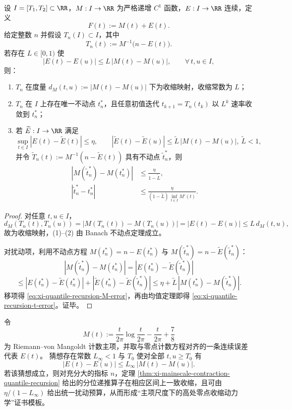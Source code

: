 \begin{theorem}[主项尺度收缩下的分位递推与扰动稳定性]\label{thm:xi-mainscale-contraction-quantile-recursion}
设 \(I=[T_1,T_2]\subset\RR\)，\(M:I\to\RR\) 为严格递增 \(C^1\) 函数，\(E:I\to\RR\) 连续，定义
\[
F(t):=M(t)+E(t).
\]
给定整数 \(n\) 并假设 \(T_n(I)\subset I\)，其中
\[
T_n(t):=M^{-1}\!\bigl(n-E(t)\bigr).
\]
若存在 \(L\in[0,1)\) 使
\[
|E(t)-E(u)|\le L\,|M(t)-M(u)|,\qquad \forall\,t,u\in I,
\]
则：
\begin{enumerate}
\item \(T_n\) 在度量
\(
d_M(t,u):=|M(t)-M(u)|
\)
下为收缩映射，收缩常数为 \(L\)；
\item \(T_n\) 在 \(I\) 上存在唯一不动点 \(t_n^\ast\)，且任意初值迭代 \(t_{k+1}=T_n(t_k)\) 以 \(L^k\) 速率收敛到 \(t_n^\ast\)；
\item 若 \(\widetilde E:I\to\RR\) 满足
\[
\sup_{t\in I}|E(t)-\widetilde E(t)|\le \eta,\qquad
|\widetilde E(t)-\widetilde E(u)|\le \widetilde L\,|M(t)-M(u)|,\ \widetilde L<1,
\]
并令
\(
\widetilde T_n(t):=M^{-1}(n-\widetilde E(t))
\)
具有不动点 \(\widetilde t_n^\ast\)，则
\begin{align}
|M(\widetilde t_n^\ast)-M(t_n^\ast)|
&\le \frac{\eta}{1-\widetilde L},\label{eq:xi-quantile-recursion-M-error}\\
|\widetilde t_n^\ast-t_n^\ast|
&\le \frac{\eta}{(1-\widetilde L)\,\inf_{t\in I}M'(t)}.\label{eq:xi-quantile-recursion-t-error}
\end{align}
\end{enumerate}
\end{theorem}
\begin{proof}
对任意 \(t,u\in I\)，
\[
d_M(T_n(t),T_n(u))
=|M(T_n(t))-M(T_n(u))|
=|E(t)-E(u)|
\le L\,d_M(t,u),
\]
故为收缩映射，(1)--(2) 由 Banach 不动点定理成立。

对扰动项，利用不动点方程
\(
M(t_n^\ast)=n-E(t_n^\ast)
\) 与
\(
M(\widetilde t_n^\ast)=n-\widetilde E(\widetilde t_n^\ast)
\)：
\[
|M(\widetilde t_n^\ast)-M(t_n^\ast)|
=|E(t_n^\ast)-\widetilde E(\widetilde t_n^\ast)|
\]
\[
\le |E(t_n^\ast)-\widetilde E(t_n^\ast)|
+|\widetilde E(t_n^\ast)-\widetilde E(\widetilde t_n^\ast)|
\le \eta+\widetilde L\,|M(t_n^\ast)-M(\widetilde t_n^\ast)|.
\]
移项得 \eqref{eq:xi-quantile-recursion-M-error}，再由均值定理即得
\eqref{eq:xi-quantile-recursion-t-error}。证毕。
\end{proof}

\begin{conjecture}[主项尺度一致收缩与高处零点动力学]\label{conj:xi-rvm-mainscale-global-contraction}
令
\[
M(t):=\frac{t}{2\pi}\log\frac{t}{2\pi}-\frac{t}{2\pi}+\frac78
\]
为 Riemann--von Mangoldt 计数主项，并取与零点计数方程对齐的一条连续误差代表 \(E(t)\)。
猜想存在常数 \(L_\infty<1\) 与 \(T_0\) 使对全部 \(t,u\ge T_0\) 有
\[
|E(t)-E(u)|\le L_\infty\,|M(t)-M(u)|.
\]
若该猜想成立，则对充分大的指标 \(n\)，定理
\ref{thm:xi-mainscale-contraction-quantile-recursion}
给出的分位递推算子在相应区间上一致收缩，且可由
\(
\eta/(1-L_\infty)
\)
给出统一扰动预算，从而形成“主项尺度下的高处零点收缩动力学”证书模板。
\end{conjecture}

\endinput

